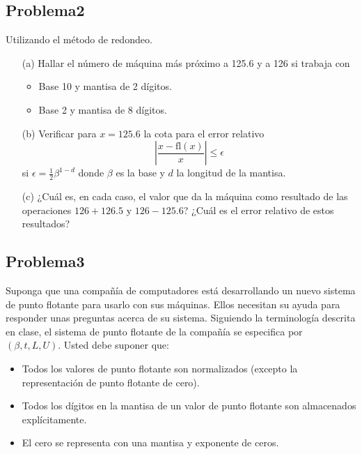 \documentclass[12pt, a4paper]{article}%
\begin{document}
\subsection*{Problema2}
Utilizando el método de redondeo.

\begin{itemize}
    \item[(a)] Hallar el número de máquina más próximo a 125.6 y a 126 si trabaja con
    \begin{itemize}
        \item Base 10 y mantisa de 2 dígitos.
        \item Base 2 y mantisa de 8 dígitos.
    \end{itemize}

    \item[(b)] Verificar para \( x = 125.6 \) la cota para el error relativo
    \[
    \left|\frac{x - \text{fl}(x)}{x}\right| \leq \epsilon
    \]
    si \( \epsilon = \frac{1}{2} \beta^{1-d} \) donde \( \beta \) es la base y \( d \) la longitud de la mantisa.

    \item[(c)] ¿Cuál es, en cada caso, el valor que da la máquina como resultado de las operaciones \( 126 + 126.5 \) y \( 126 - 125.6 \)? ¿Cuál es el error relativo de estos resultados?
\end{itemize}

\subsection*{Problema3}
Suponga que una compañía de computadores está desarrollando un nuevo sistema de punto flotante para usarlo con sus máquinas. Ellos necesitan su ayuda para responder unas preguntas acerca de su sistema. Siguiendo la terminología descrita en clase, el sistema de punto flotante de la compañía se especifica por \( (\beta, t, L, U) \). Usted debe suponer que:

\begin{itemize}
    \item Todos los valores de punto flotante son normalizados (excepto la representación de punto flotante de cero).
    \item Todos los dígitos en la mantisa de un valor de punto flotante son almacenados explícitamente.
    \item El cero se representa con una mantisa y exponente de ceros.
\end{itemize}
\end{document}
